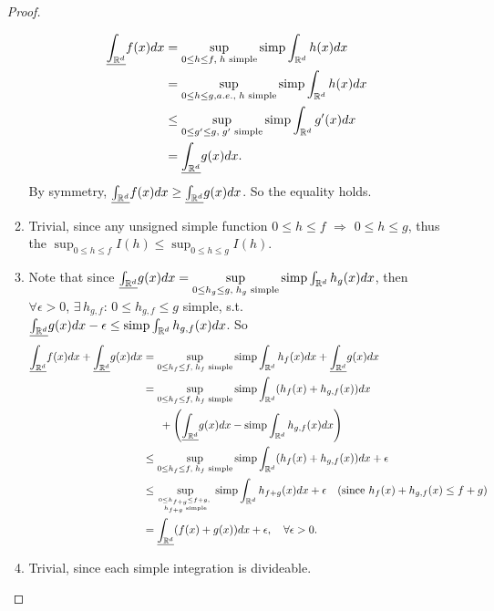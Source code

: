 \documentclass[11pt]{article}
\begin{document}
\begin{itemize}
\begin{proof}
\begin{enumerate}
\begin{align*}
\underline{\int_{{\mathbb R}^{d}}}f(x)dx &= \sup\limits_{0\le h\le f,\; h\text{ simple}} \text{simp}\int_{{\mathbb R}^{d}}h(x) dx\\
&=  \sup\limits_{0\le h\le g, a.e. ,\; h\text{ simple}} \text{simp}\int_{{\mathbb R}^{d}}h(x) dx\\
& \le \sup\limits_{0\le g'\le g,\; g'\text{ simple}} \text{simp}\int_{{\mathbb R}^{d}}g'(x) dx\\
& = \underline{\int_{{\mathbb R}^{d}}}g(x)dx.
\end{align*} By symmetry,  $\underline{\int_{{\mathbb R}^{d}}}f(x)dx \ge \underline{\int_{{\mathbb R}^{d}}}g(x)dx$. So the equality holds. 

\item Trivial, since any unsigned simple function $0\le h\le f$ $\Rightarrow$ $0\le h\le g$, thus the $\sup_{0\le h\le f}I(h)\le \sup_{0\le h\le g}I(h)$. 

\item Note that since $\underline{\int_{{\mathbb R}^{d}}}g(x)dx = \sup\limits_{0\le h_{g}\le g,\; h_{g}\text{ simple}} \text{simp}\int_{{\mathbb R}^{d}}h_{g}(x) dx$, then $\forall \epsilon>0$, $\exists\, h_{g,f}:\, 0 \le  h_{g,f} \le g$ simple, s.t. $\underline{\int_{{\mathbb R}^{d}}}g(x)dx - \epsilon \le   \text{simp}\int_{{\mathbb R}^{d}}h_{g,f}(x)dx$. So
 \begin{align*}
\underline{\int_{{\mathbb R}^{d}}}f(x)dx + \underline{\int_{{\mathbb R}^{d}}}g(x)dx &= \sup\limits_{0\le h_{f}\le f,\; h_{f}\text{ simple}} \text{simp}\int_{{\mathbb R}^{d}}h_{f}(x) dx+  \underline{\int_{{\mathbb R}^{d}}}g(x)dx\\
&=  \sup\limits_{0\le h_{f}\le f,\; h_{f}\text{ simple}} \text{simp}\int_{{\mathbb R}^{d}}(h_{f}(x) + h_{g,f}(x))dx\\
&\phantom{==}+ \left(\underline{\int_{{\mathbb R}^{d}}}g(x)dx - \text{simp}\int_{{\mathbb R}^{d}}h_{g,f}(x)dx \right)\\
& \le  \sup\limits_{0\le h_{f}\le f,\; h_{f}\text{ simple}} \text{simp}\int_{{\mathbb R}^{d}}(h_{f}(x) + h_{g,f}(x))dx+ \epsilon\\
&\le  \sup\limits_{0\le h_{f+g}\le f+g,\;\atop h_{f+g}\text{ simple}} \text{simp}\int_{{\mathbb R}^{d}} h_{f+g}(x) dx+ \epsilon\quad (\text{since }h_{f}(x) + h_{g,f}(x)\le f+g)\\
& = \underline{\int_{{\mathbb R}^{d}}}(f(x)+g(x))dx+ \epsilon, \quad \forall \epsilon>0.
\end{align*} 

\item Trivial, since each simple integration is divideable. 


\end{enumerate}
\end{proof}
\end{itemize}
\end{document}
